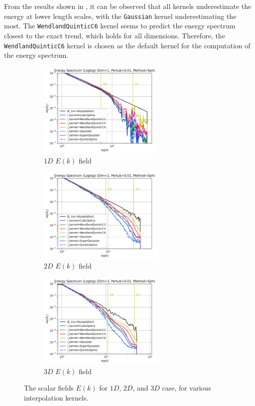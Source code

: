From the results shown in , it can be observed that all kernels underestimate the energy at lower length scales, with the \texttt{Gaussian} kernel underestimating the most.
The \texttt{WendlandQuinticC6} kernel seems to predict the energy spectrum closest to the exact trend, which holds for all dimensions.
Therefore, the \texttt{WendlandQuinticC6} kernel is chosen as the default kernel for the computation of the energy spectrum.

\begin{figure}[htbp!]
	\begin{subfigure}{7cm}
		\centering\includegraphics[width=6cm]{Code-Figures/sin-vel-prof-i-kernel/Energy Spectrum (Loglog) (Dim=1, Pertub=0.01, Method=Sph).png}
		\caption{$1D$ $E(k)$ field}
	\end{subfigure}
	\begin{subfigure}{7cm}
		\centering\includegraphics[width=6cm]{Code-Figures/sin-vel-prof-i-kernel/Energy Spectrum (Loglog) (Dim=2, Pertub=0.01, Method=Sph).png}
		\caption{$2D$ $E(k)$ field}
	\end{subfigure}
	\begin{subfigure}{7cm}
		\centering\includegraphics[width=6cm]{Code-Figures/sin-vel-prof-i-kernel/Energy Spectrum (Loglog) (Dim=3, Pertub=0.01, Method=Sph).png}
		\caption{$3D$ $E(k)$ field}
	\end{subfigure}
	\caption{The scalar fields $E(k)$ for $1D$, $2D$, and $3D$ case, for various interpolation kernels.}
	\label{fig:espec-scalar-fields-i-kernels}
\end{figure}

